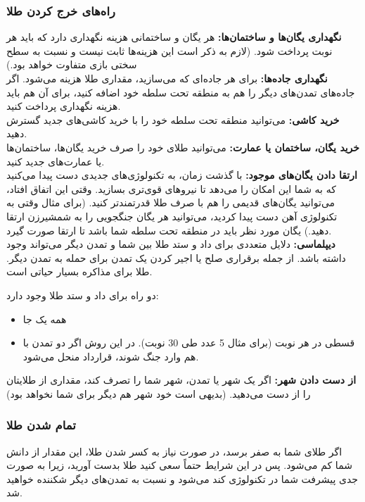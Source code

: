 \documentclass[]{article}
\begin{document}
\subsubsection*{{\titr راه‌های خرج کردن طلا}}
\noindent \textbf{نگهداری یگان‌ها و ساختمان‌ها:} هر یگان و ساختمانی هزینه نگهداری دارد که باید هر نوبت پرداخت شود. (لازم به ذکر است این هزینه‌ها ثابت نیست و نسبت به سطح سختی بازی متفاوت خواهد بود.)
\\\noindent \textbf{نگهداری جاده‌ها:} برای هر جاده‌ای که می‌سازید، مقداری طلا هزینه می‌شود. اگر جاده‌های تمدن‌های دیگر را هم به منطقه تحت سلطه خود اضافه کنید، برای آن هم باید هزینه نگهداری پرداخت کنید.
\\\noindent \textbf{خرید کاشی:} می‌توانید منطقه تحت سلطه خود را با خرید کاشی‌های جدید گسترش دهید.
\\\noindent \textbf{خرید یگان، ساختمان یا عمارت:} می‌توانید طلای خود را صرف خرید یگان‌ها، ساختمان‌ها یا عمارت‌های جدید کنید.
\\\noindent \textbf{ارتقا دادن یگان‌های موجود:} با گذشت زمان، به تکنولوژی‌های جدیدی دست پیدا می‌کنید که به شما این امکان را می‌دهد تا نیروهای قوی‌تری بسازید. وقتی این اتفاق افتاد، می‌توانید یگان‌های قدیمی را هم با صرف طلا قدرتمندتر کنید. (برای مثال وقتی به تکنولوژی آهن دست پیدا کردید، می‌توانید هر یگان جنگجویی را به شمشیرزن ارتقا دهید.)
یگان مورد نظر باید در منطقه تحت سلطه شما باشد تا ارتقا صورت گیرد.
\\\noindent \textbf{دیپلماسی:} دلایل متعددی برای داد‌ و ستد طلا بین شما و تمدن دیگر می‌تواند وجود داشته باشد. از جمله برقراری صلح یا اجیر کردن یک تمدن برای حمله به تمدن دیگر. طلا برای مذاکره بسیار حیاتی است.

دو راه برای داد و ستد طلا وجود دارد:
\begin{itemize}
	\item همه یک جا
	\item قسطی در هر نوبت (برای مثال 5 عدد طی 30 نوبت). در این روش اگر دو تمدن با هم وارد جنگ شوند، قرارداد منحل می‌شود.
\end{itemize}
\noindent \textbf{از دست دادن شهر:} اگر یک شهر یا تمدن، شهر شما را تصرف کند، مقداری از طلایتان را از دست می‌دهید. (بدیهی است خود شهر هم دیگر برای شما نخواهد بود)
\subsubsection*{{\titr تمام شدن طلا}}
اگر طلای شما به صفر برسد، در صورت نیاز به کسر شدن طلا، این مقدار از دانش شما کم می‌شود. پس در این شرایط حتماً سعی کنید طلا بدست آورید، زیرا به صورت جدی پیشرفت شما در تکنولوژی کند می‌شود و نسبت به تمدن‌های دیگر شکننده خواهید شد.
\end{document}

